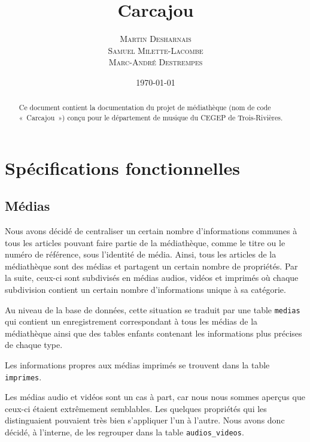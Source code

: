 \documentclass[letter, 11pt]{report}
\begin{document}
\title{Carcajou}
\author{\textsc{Martin Desharnais} \\ \textsc{Samuel Milette-Lacombe} \\ \textsc{Marc-André Destrempes}}
\date{\today}

\maketitle

\begin{abstract}
Ce document contient la documentation du projet de médiathèque (nom de code «~Carcajou~») conçu pour le département de musique du CEGEP de Trois-Rivières.
\end{abstract}

\newpage
\tableofcontents
\newpage

\chapter{Spécifications fonctionnelles}


\section{Médias}

Nous avons décidé de centraliser un certain nombre d'informations communes à tous les articles pouvant faire partie de la médiathèque, comme le titre ou le numéro de référence, sous l'identité de média. Ainsi, tous les articles de la médiathèque sont des médias et partagent un certain nombre de propriétés. Par la suite, ceux-ci sont subdivisés en médias audios, vidéos et imprimés où chaque subdivision contient un certain nombre d'informations unique à sa catégorie.

Au niveau de la base de données, cette situation se traduit par une table \texttt{medias} qui contient un enregistrement correspondant à tous les médias de la médiathèque ainsi que des tables enfants contenant les informations plus précises de chaque type.

Les informations propres aux médias imprimés se trouvent dans la table \texttt{imprimes}.

Les médias audio et vidéos sont un cas à part, car nous nous sommes aperçus que ceux-ci étaient extrêmement semblables. Les quelques propriétés qui les distinguaient pouvaient très bien s'appliquer l'un à l'autre. Nous avons donc décidé, à l'interne, de les regrouper dans la table \texttt{audios\_videos}.
\end{document}
